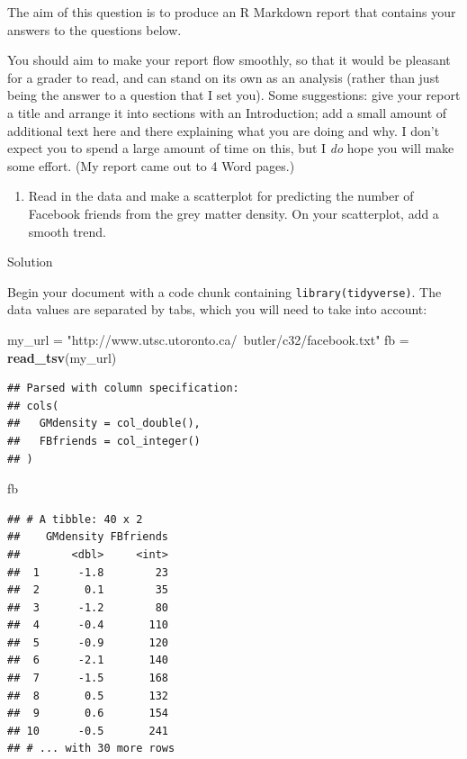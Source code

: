 \documentclass[]{tufte-book}
\newenvironment{Shaded}{}{}
\newcommand{\KeywordTok}[1]{\textcolor[rgb]{0.00,0.44,0.13}{\textbf{#1}}}
\newcommand{\NormalTok}[1]{#1}
\newcommand{\StringTok}[1]{\textcolor[rgb]{0.25,0.44,0.63}{#1}}
\providecommand{\tightlist}{%
  \setlength{\itemsep}{0pt}\setlength{\parskip}{0pt}}
\theoremstyle{definition}
\theoremstyle{definition}
\theoremstyle{definition}
\theoremstyle{remark}
\begin{document}
The aim of this question is to produce an R Markdown report that
contains your answers to the questions below.

You should aim to make your report flow smoothly, so that it would be
pleasant for a grader to read, and can stand on its own as an analysis
(rather than just being the answer to a question that I set you). Some
suggestions: give your report a title and arrange it into sections with
an Introduction; add a small amount of additional text here and there
explaining what you are doing and why. I don't expect you to spend a
large amount of time on this, but I \emph{do} hope you will make some
effort. (My report came out to 4 Word pages.)

\begin{enumerate}
\def\labelenumi{(\alph{enumi})}
\tightlist
\item
  Read in the data and make a scatterplot for predicting the number of
  Facebook friends from the grey matter density. On your scatterplot,
  add a smooth trend.
\end{enumerate}

Solution

Begin your document with a code chunk containing
\texttt{library(tidyverse)}. The data values are separated by tabs,
which you will need to take into account:

\begin{Shaded}
\begin{Highlighting}[]
\NormalTok{my_url =}\StringTok{ "http://www.utsc.utoronto.ca/~butler/c32/facebook.txt"}
\NormalTok{fb =}\StringTok{ }\KeywordTok{read_tsv}\NormalTok{(my_url)}
\end{Highlighting}
\end{Shaded}

\begin{verbatim}
## Parsed with column specification:
## cols(
##   GMdensity = col_double(),
##   FBfriends = col_integer()
## )
\end{verbatim}

\begin{Shaded}
\begin{Highlighting}[]
\NormalTok{fb}
\end{Highlighting}
\end{Shaded}

\begin{verbatim}
## # A tibble: 40 x 2
##    GMdensity FBfriends
##        <dbl>     <int>
##  1      -1.8        23
##  2       0.1        35
##  3      -1.2        80
##  4      -0.4       110
##  5      -0.9       120
##  6      -2.1       140
##  7      -1.5       168
##  8       0.5       132
##  9       0.6       154
## 10      -0.5       241
## # ... with 30 more rows
\end{verbatim}
\end{document}
